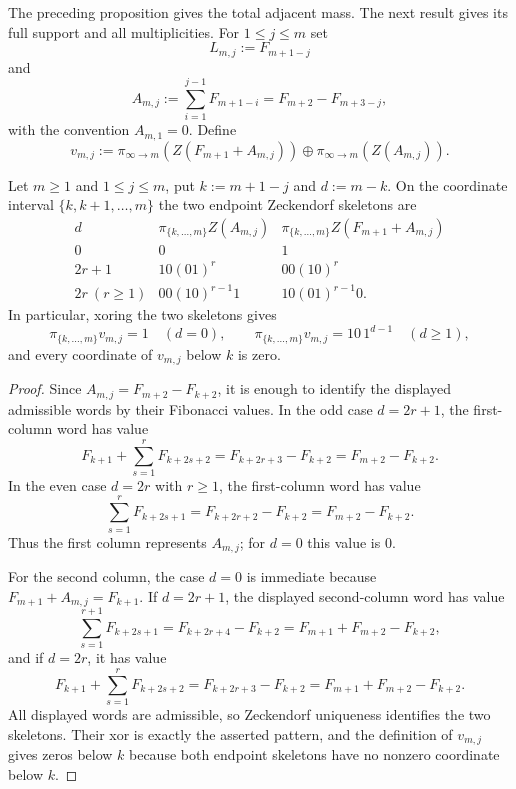 The preceding proposition gives the total adjacent mass.  The next result gives
its full support and all multiplicities.  For $1\le j\le m$ set
\[
L_{m,j}:=F_{m+1-j}
\]
and
\[
A_{m,j}:=\sum_{i=1}^{j-1}F_{m+1-i}=F_{m+2}-F_{m+3-j},
\]
with the convention $A_{m,1}=0$.  Define
\[
v_{m,j}
:=
\pi_{\infty\to m}(Z(F_{m+1}+A_{m,j}))
\oplus
\pi_{\infty\to m}(Z(A_{m,j})).
\]

\begin{lemma}
\label{lem:adjacent-endpoint-skeletons}
Let $m\ge 1$ and $1\le j\le m$, put $k:=m+1-j$ and $d:=m-k$.  On the
coordinate interval $\{k,k+1,\dots,m\}$ the two endpoint Zeckendorf skeletons
are
\[
\begin{array}{c|c|c}
d & \pi_{\{k,\dots,m\}}Z(A_{m,j})
& \pi_{\{k,\dots,m\}}Z(F_{m+1}+A_{m,j})\\ \hline
0&0&1\\
2r+1&10(01)^r&00(10)^r\\
2r\ (r\ge 1)&00(10)^{r-1}1&10(01)^{r-1}0.
\end{array}
\]
In particular, xoring the two skeletons gives
\[
\pi_{\{k,\dots,m\}}v_{m,j}=1\quad(d=0),
\qquad
\pi_{\{k,\dots,m\}}v_{m,j}=10\,1^{d-1}\quad(d\ge 1),
\]
and every coordinate of $v_{m,j}$ below $k$ is zero.
\end{lemma}

\begin{proof}
Since $A_{m,j}=F_{m+2}-F_{k+2}$, it is enough to identify the displayed
admissible words by their Fibonacci values.  In the odd case $d=2r+1$, the
first-column word has value
\[
F_{k+1}+\sum_{s=1}^r F_{k+2s+2}=F_{k+2r+3}-F_{k+2}=F_{m+2}-F_{k+2}.
\]
In the even case $d=2r$ with $r\ge 1$, the first-column word has value
\[
\sum_{s=1}^r F_{k+2s+1}=F_{k+2r+2}-F_{k+2}=F_{m+2}-F_{k+2}.
\]
Thus the first column represents $A_{m,j}$; for $d=0$ this value is $0$.

For the second column, the case $d=0$ is immediate because
$F_{m+1}+A_{m,j}=F_{k+1}$.  If $d=2r+1$, the displayed second-column word has
value
\[
\sum_{s=1}^{r+1}F_{k+2s+1}=F_{k+2r+4}-F_{k+2}=F_{m+1}+F_{m+2}-F_{k+2},
\]
and if $d=2r$, it has value
\[
F_{k+1}+\sum_{s=1}^r F_{k+2s+2}=F_{k+2r+3}-F_{k+2}=F_{m+1}+F_{m+2}-F_{k+2}.
\]
All displayed words are admissible, so Zeckendorf uniqueness identifies the two
skeletons.  Their xor is exactly the asserted pattern, and the definition of
$v_{m,j}$ gives zeros below $k$ because both endpoint skeletons have no nonzero
coordinate below $k$.
\end{proof}

